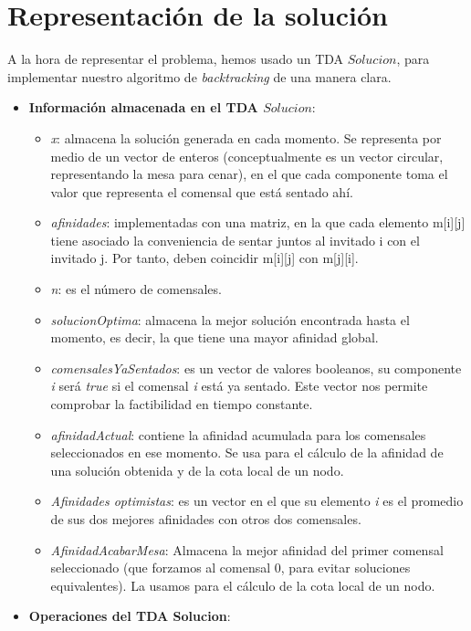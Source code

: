 \documentclass{article}
\begin{document}
	\section{Representación de la solución}
	A la hora de representar el problema, hemos usado un TDA $Solucion$, para implementar nuestro algoritmo de \textit{backtracking} de una manera clara.
	\begin{itemize}
		\item \textbf{Información almacenada en el TDA $Solucion$}:
		\begin{itemize}
			\item \textit {x}: almacena la solución generada en cada momento. Se representa por medio de un vector de enteros (conceptualmente es un vector circular, representando la mesa para cenar), en el que cada componente toma el valor que representa el comensal que está sentado ahí.
			\item \textit{afinidades}: implementadas con una matriz, en la que cada elemento m[i][j] tiene asociado la conveniencia de sentar juntos al invitado i con el invitado j. Por tanto, deben coincidir m[i][j] con m[j][i].
			\item \textit {n}: es el número de comensales.
			\item \textit {solucionOptima}: almacena la mejor solución encontrada hasta el momento, es decir, la que tiene una mayor afinidad global.
			\item \textit {comensalesYaSentados}: es un vector de valores booleanos, su componente \textit{i} será \textit{true} si el comensal \textit{i} está ya sentado. Este vector nos permite comprobar la factibilidad en tiempo constante.
			\item \textit {afinidadActual}: contiene la afinidad acumulada para los comensales seleccionados en ese momento. Se usa para el cálculo de la afinidad de una solución obtenida y de la cota local de un nodo.
			\item \textit {Afinidades optimistas}: es un vector en el que su elemento \textit{i} es el promedio de sus dos mejores afinidades con otros dos comensales.
			\item \textit {AfinidadAcabarMesa}: Almacena la mejor afinidad del primer comensal seleccionado (que forzamos al comensal 0, para evitar soluciones equivalentes). La usamos para el cálculo de la cota local de un nodo.
		\end{itemize}
		\item \textbf{Operaciones del TDA Solucion}:
		\begin{itemize}

\end{itemize}
\end{itemize}
\end{document}
